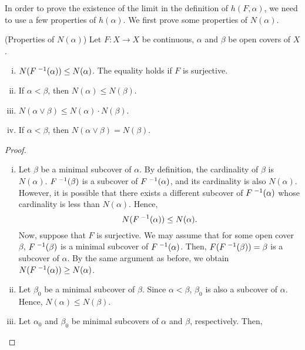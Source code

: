 \documentclass[10pt,twoside,draft]{book}
\begin{document}
In order to prove the existence of the limit in the definition of $h(F, \alpha)$, we need to use a few properties of $h(\alpha)$.
We first prove some properties of $N(\alpha)$.
\begin{proposition}
  (Properties of $N(\alpha)$)
  Let $F: X \to X$ be continuous, $\alpha$ and $\beta$ be open covers of $X$.
  \begin{enumerate}[(i)]
    \item 
      $N(F^{\;-1}(\alpha)) \leq N(\alpha)$.
      The equality holds if $F$ is surjective.
    \item 
      If $\alpha < \beta$, then $N(\alpha) \leq N(\beta)$.
    \item 
      $N(\alpha \vee \beta) \leq N(\alpha) \cdot N(\beta)$.
    \item 
      If $\alpha < \beta$, then $N(\alpha \vee \beta) = N(\beta)$.
  \end{enumerate}
  \begin{proof}
    \begin{enumerate}[(i)]
      \item 
        Let $\beta$ be a minimal subcover of $\alpha$.
        By definition, the cardinality of $\beta$ is $N(\alpha)$.
        $F^{\;-1}(\beta)$ is a subcover of $F^{\;-1}(\alpha)$, and its cardinality is also $N(\alpha)$.
        However, it is possible that there exists a different subcover of $F^{\;-1}(\alpha)$ whose cardinality is less than $N(\alpha)$.
        Hence, 
        \begin{equation*}
          N(F^{\;-1}(\alpha)) \leq N(\alpha).
        \end{equation*}
        Now, suppose that $F$ is surjective.
        We may assume that for some open cover $\beta$, $F^{\;-1}(\beta)$ is a minimal subcover of $F^{\;-1}(\alpha)$.
        Then, $F(F^{\;-1}(\beta)) = \beta$ is a subcover of $\alpha$.
        By the same argument as before, we obtain $N(F^{\;-1}(\alpha)) \geq N(\alpha)$.
      \item
        Let $\beta_0$ be a minimal subcover of $\beta$.
        Since $\alpha < \beta$, $\beta_0$ is also a subcover of $\alpha$.
        Hence, $N(\alpha) \leq N(\beta)$.
      \item
        Let $\alpha_0$ and $\beta_0$ be minimal subcovers of $\alpha$ and $\beta$, respectively.
        Then,
        \begin{equation*}

\end{equation*}
\end{enumerate}
\end{proof}
\end{proposition}
\end{document}

